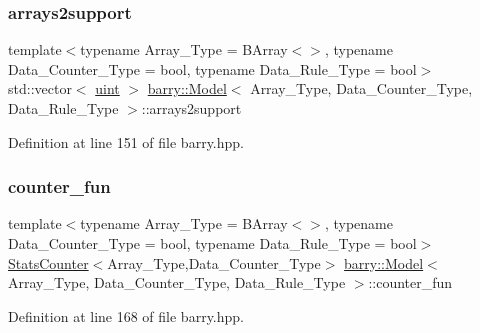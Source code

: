 \mbox{\label{classbarry_1_1_model_a9cd0e9c9d29df6637ab30ebe3daeeff7}} 
\subsubsection{\texorpdfstring{arrays2support}{arrays2support}}
{\footnotesize\ttfamily template$<$typename Array\+\_\+\+Type  = B\+Array$<$$>$, typename Data\+\_\+\+Counter\+\_\+\+Type  = bool, typename Data\+\_\+\+Rule\+\_\+\+Type  = bool$>$ \\
std\+::vector$<$ \hyperlink{namespacebarry_a11dfc53ddb4672278319aa04f1e09a6c}{uint} $>$ \hyperlink{classbarry_1_1_model}{barry\+::\+Model}$<$ Array\+\_\+\+Type, Data\+\_\+\+Counter\+\_\+\+Type, Data\+\_\+\+Rule\+\_\+\+Type $>$\+::arrays2support}



Definition at line 151 of file barry.\+hpp.

\mbox{\label{classbarry_1_1_model_ada40ca4ec8b21a3dbbe646edbfb1df45}} 
\subsubsection{\texorpdfstring{counter\+\_\+fun}{counter\_fun}}
{\footnotesize\ttfamily template$<$typename Array\+\_\+\+Type  = B\+Array$<$$>$, typename Data\+\_\+\+Counter\+\_\+\+Type  = bool, typename Data\+\_\+\+Rule\+\_\+\+Type  = bool$>$ \\
\hyperlink{classbarry_1_1_stats_counter}{Stats\+Counter}$<$Array\+\_\+\+Type,Data\+\_\+\+Counter\+\_\+\+Type$>$ \hyperlink{classbarry_1_1_model}{barry\+::\+Model}$<$ Array\+\_\+\+Type, Data\+\_\+\+Counter\+\_\+\+Type, Data\+\_\+\+Rule\+\_\+\+Type $>$\+::counter\+\_\+fun}



Definition at line 168 of file barry.\+hpp.

\mbox{\label{classbarry_1_1_model_aea013a7ac325ece7564e8ea9cdf441a2}} 
